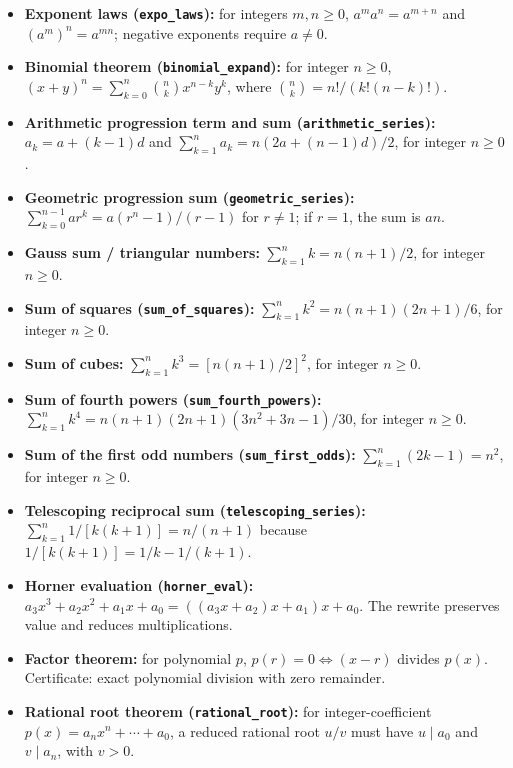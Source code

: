 \documentclass[
  10pt,
]{article}
\begin{document}
\begin{itemize}
  \textbf{Difference of powers (\texttt{power\_difference}):} for
  integer \(n\ge1\), \(a^n-b^n=(a-b)\sum_{k=0}^{n-1}a^{n-1-k}b^k\).
\item
  \textbf{Exponent laws (\texttt{expo\_laws}):} for integers
  \(m,n\ge0\), \(a^ma^n=a^{m+n}\) and \((a^m)^n=a^{mn}\); negative
  exponents require \(a\ne0\).
\item
  \textbf{Binomial theorem (\texttt{binomial\_expand}):} for integer
  \(n\ge0\), \((x+y)^n=\sum_{k=0}^{n}\binom nk x^{n-k}y^k\), where
  \(\binom nk=n!/(k!(n-k)!)\).
\item
  \textbf{Arithmetic progression term and sum
  (\texttt{arithmetic\_series}):} \(a_k=a+(k-1)d\) and
  \(\sum_{k=1}^{n}a_k=n(2a+(n-1)d)/2\), for integer \(n\ge0\).
\item
  \textbf{Geometric progression sum (\texttt{geometric\_series}):}
  \(\sum_{k=0}^{n-1}ar^k=a(r^n-1)/(r-1)\) for \(r\ne1\); if \(r=1\), the
  sum is \(an\).
\item
  \textbf{Gauss sum / triangular numbers:} \(\sum_{k=1}^{n}k=n(n+1)/2\),
  for integer \(n\ge0\).
\item
  \textbf{Sum of squares (\texttt{sum\_of\_squares}):}
  \(\sum_{k=1}^{n}k^2=n(n+1)(2n+1)/6\), for integer \(n\ge0\).
\item
  \textbf{Sum of cubes:} \(\sum_{k=1}^{n}k^3=[n(n+1)/2]^2\), for integer
  \(n\ge0\).
\item
  \textbf{Sum of fourth powers (\texttt{sum\_fourth\_powers}):}
  \(\sum_{k=1}^{n}k^4=n(n+1)(2n+1)(3n^2+3n-1)/30\), for integer
  \(n\ge0\).
\item
  \textbf{Sum of the first odd numbers (\texttt{sum\_first\_odds}):}
  \(\sum_{k=1}^{n}(2k-1)=n^2\), for integer \(n\ge0\).
\item
  \textbf{Telescoping reciprocal sum (\texttt{telescoping\_series}):}
  \(\sum_{k=1}^{n}1/[k(k+1)]=n/(n+1)\) because
  \(1/[k(k+1)]=1/k-1/(k+1)\).
\item
  \textbf{Horner evaluation (\texttt{horner\_eval}):}
  \(a_3x^3+a_2x^2+a_1x+a_0=((a_3x+a_2)x+a_1)x+a_0\). The rewrite
  preserves value and reduces multiplications.
\item
  \textbf{Factor theorem:} for polynomial \(p\), \(p(r)=0\iff(x-r)\)
  divides \(p(x)\). Certificate: exact polynomial division with zero
  remainder.
\item
  \textbf{Rational root theorem (\texttt{rational\_root}):} for
  integer-coefficient \(p(x)=a_nx^n+\cdots+a_0\), a reduced rational
  root \(u/v\) must have \(u\mid a_0\) and \(v\mid a_n\), with \(v>0\).

\end{itemize}
\end{document}
